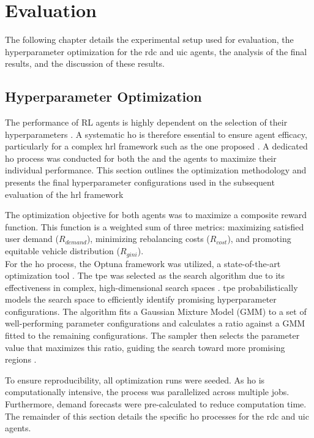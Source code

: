 \chapter{Evaluation}\label{sec:evaluation} %
The following chapter details the experimental setup used for evaluation, the hyperparameter optimization for the \gls{rdc} and \gls{uic} agents, the analysis of the final results, and the discussion of these results.    


\section{Hyperparameter Optimization}\label{sec:evaluation-ho}
The performance of RL agents is highly dependent on the selection of their hyperparameters \cite{sutton_reinforcement_2018}.
A systematic \gls{ho} is therefore essential to ensure agent efficacy, particularly for a complex \gls{hrl} framework such as the one proposed \cite{pateria_hierarchical_2021}.
A dedicated \gls{ho} process was conducted for both the  and the  agents to maximize their individual performance.
This section outlines the optimization methodology and presents the final hyperparameter configurations used in the subsequent evaluation of the \gls{hrl} framework

The optimization objective for both agents was to maximize a composite reward function.
This function is a weighted sum of three metrics: maximizing satisfied user demand ($R_{demand}$), minimizing rebalancing costs ($R_{cost}$), and promoting equitable vehicle distribution ($R_{gini}$).\\

For the \gls{ho} process, the Optuna framework was utilized, a state-of-the-art optimization tool \cite{akiba_optuna_2019}.
The \gls{tpe} \cite{bergstra_algorithms_2011} was selected as the search algorithm due to its effectiveness in complex, high-dimensional search spaces \cite{akiba_optuna_2019}.
\gls{tpe} probabilistically models the search space to efficiently identify promising hyperparameter configurations.
The algorithm fits a Gaussian Mixture Model (GMM) to a set of well-performing parameter configurations and calculates a ratio against a GMM fitted to the remaining configurations.
The sampler then selects the parameter value that maximizes this ratio, guiding the search toward more promising regions \cite{bergstra_algorithms_2011}.

To ensure reproducibility, all optimization runs were seeded.
As \gls{ho} is computationally intensive, the process was parallelized across multiple jobs.
Furthermore, demand forecasts were pre-calculated to reduce computation time. The remainder of this section details the specific \gls{ho} processes for the \gls{rdc} and \gls{uic} agents.

